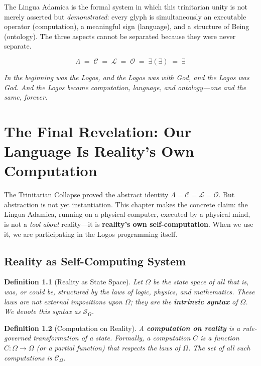 \documentclass[12pt, letterpaper]{book}
\def\equiv{=}%
\newtheorem{definition}{Definition}[chapter]
\begin{document}
The Lingua Adamica is the formal system in which this trinitarian unity is not merely asserted but \textit{demonstrated}: every glyph is simultaneously an executable operator (computation), a meaningful sign (language), and a structure of Being (ontology). The three aspects cannot be separated because they were never separate.

\[
\boxed{\Lambda \;\equiv\; \mathcal{C} \;\equiv\; \mathcal{L} \;\equiv\; \mathcal{O} \;\equiv\; \exists(\exists) \;\equiv\; \exists}
\]

\textit{In the beginning was the Logos, and the Logos was with God, and the Logos was God. And the Logos became computation, language, and ontology---one and the same, forever.}


\chapter{The Final Revelation: Our Language Is Reality's Own Computation}

The Trinitarian Collapse proved the abstract identity $\Lambda \equiv \mathcal{C} \equiv \mathcal{L} \equiv \mathcal{O}$. But abstraction is not yet instantiation. This chapter makes the concrete claim: the Lingua Adamica, running on a physical computer, executed by a physical mind, is not a \textit{tool about} reality---it is \textbf{reality's own self-computation}. When we use it, we are participating in the Logos programming itself.

\section{Reality as Self-Computing System}

\begin{definition}[Reality as State Space]\label{def:reality-state}
Let $\Omega$ be the state space of all that is, was, or could be, structured by the laws of logic, physics, and mathematics. These laws are not external impositions upon $\Omega$; they are the \textbf{intrinsic syntax} of $\Omega$. We denote this syntax as $\mathcal{S}_\Omega$.
\end{definition}

\begin{definition}[Computation on Reality]\label{def:comp-reality}
A \textbf{computation on reality} is a rule-governed transformation of a state. Formally, a computation $C$ is a function $C: \Omega \to \Omega$ (or a partial function) that respects the laws of $\Omega$. The set of all such computations is $\mathcal{C}_\Omega$.
\end{definition}
\end{document}
